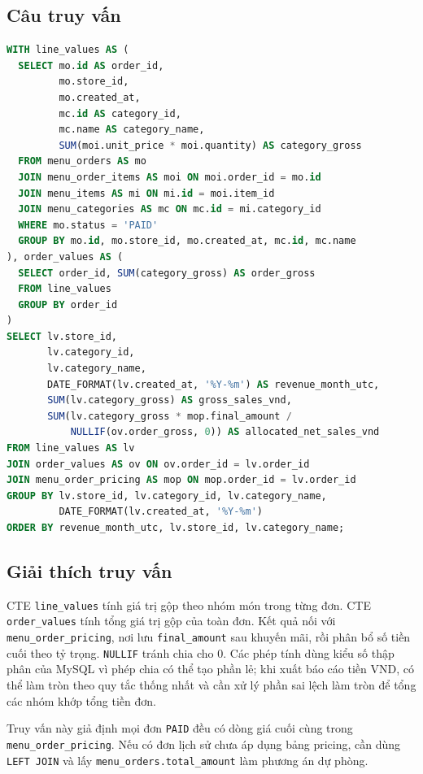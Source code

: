 \subsection*{Câu truy vấn}
\begin{lstlisting}[language=SQL]
WITH line_values AS (
  SELECT mo.id AS order_id,
         mo.store_id,
         mo.created_at,
         mc.id AS category_id,
         mc.name AS category_name,
         SUM(moi.unit_price * moi.quantity) AS category_gross
  FROM menu_orders AS mo
  JOIN menu_order_items AS moi ON moi.order_id = mo.id
  JOIN menu_items AS mi ON mi.id = moi.item_id
  JOIN menu_categories AS mc ON mc.id = mi.category_id
  WHERE mo.status = 'PAID'
  GROUP BY mo.id, mo.store_id, mo.created_at, mc.id, mc.name
), order_values AS (
  SELECT order_id, SUM(category_gross) AS order_gross
  FROM line_values
  GROUP BY order_id
)
SELECT lv.store_id,
       lv.category_id,
       lv.category_name,
       DATE_FORMAT(lv.created_at, '%Y-%m') AS revenue_month_utc,
       SUM(lv.category_gross) AS gross_sales_vnd,
       SUM(lv.category_gross * mop.final_amount /
           NULLIF(ov.order_gross, 0)) AS allocated_net_sales_vnd
FROM line_values AS lv
JOIN order_values AS ov ON ov.order_id = lv.order_id
JOIN menu_order_pricing AS mop ON mop.order_id = lv.order_id
GROUP BY lv.store_id, lv.category_id, lv.category_name,
         DATE_FORMAT(lv.created_at, '%Y-%m')
ORDER BY revenue_month_utc, lv.store_id, lv.category_name;
\end{lstlisting}

\subsection*{Giải thích truy vấn}
CTE \texttt{line\_values} tính giá trị gộp theo nhóm món trong từng đơn. CTE \texttt{order\_values} tính tổng giá trị gộp của toàn đơn. Kết quả nối với \texttt{menu\_order\_pricing}, nơi lưu \texttt{final\_amount} sau khuyến mãi, rồi phân bổ số tiền cuối theo tỷ trọng. \texttt{NULLIF} tránh chia cho 0. Các phép tính dùng kiểu số thập phân của MySQL vì phép chia có thể tạo phần lẻ; khi xuất báo cáo tiền VND, có thể làm tròn theo quy tắc thống nhất và cần xử lý phần sai lệch làm tròn để tổng các nhóm khớp tổng tiền đơn.

Truy vấn này giả định mọi đơn \texttt{PAID} đều có dòng giá cuối cùng trong \texttt{menu\_order\_pricing}. Nếu có đơn lịch sử chưa áp dụng bảng pricing, cần dùng \texttt{LEFT JOIN} và lấy \texttt{menu\_orders.total\_amount} làm phương án dự phòng.

